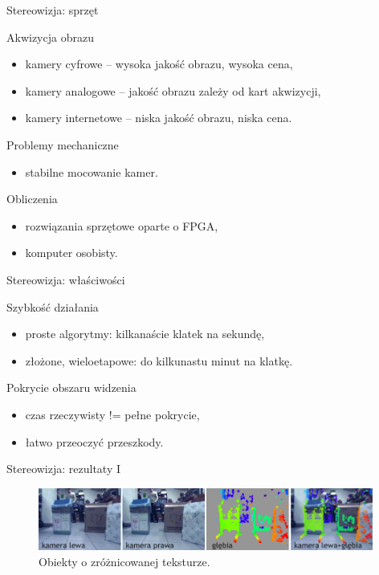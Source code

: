 \documentclass[xcolor=x11names,compress]{beamer}
\renewcommand{\(}{\begin{columns}}
\renewcommand{\)}{\end{columns}}
\newcommand{\<}[1]{\begin{column}{#1}}
\renewcommand{\>}{\end{column}}
\begin{document}
\begin{frame}{Stereowizja: sprzęt}

    \alert{Akwizycja obrazu}
    \begin{itemize}
    \item kamery cyfrowe -- wysoka jakość obrazu, wysoka cena,
    \item kamery analogowe -- jakość obrazu zależy od kart akwizycji,
    \item kamery internetowe -- niska jakość obrazu, niska cena.
    \end{itemize}

    \vspace{.3cm}

    \alert{Problemy mechaniczne}
    \begin{itemize}
    \item stabilne mocowanie kamer.
    \end{itemize}

    \vspace{.3cm}

    \alert{Obliczenia}
    \begin{itemize}
    \item rozwiązania sprzętowe oparte o FPGA,
    \item komputer osobisty.
    \end{itemize}

\end{frame}

\begin{frame}{Stereowizja: właściwości}

    \alert{Szybkość działania}
    \begin{itemize}
    \item proste algorytmy: kilkanaście klatek na sekundę,
    \item złożone, wieloetapowe: do kilkunastu minut na klatkę.
    \end{itemize}

    \vspace{1cm}

    \alert{Pokrycie obszaru widzenia}
    \begin{itemize}
    \item czas rzeczywisty != pełne pokrycie,
    \item łatwo przeoczyć przeszkody.
    \end{itemize}

\end{frame}

\begin{frame}{Stereowizja: rezultaty I}

    \begin{figure}[h!]
    \centering
    \includegraphics[width=11cm]{../Common/img/stereo_2}
    \caption{Obiekty o zróżnicowanej teksturze.}
    \label{fig:stereo_2}
    \end{figure}

\end{frame}
\end{document}
